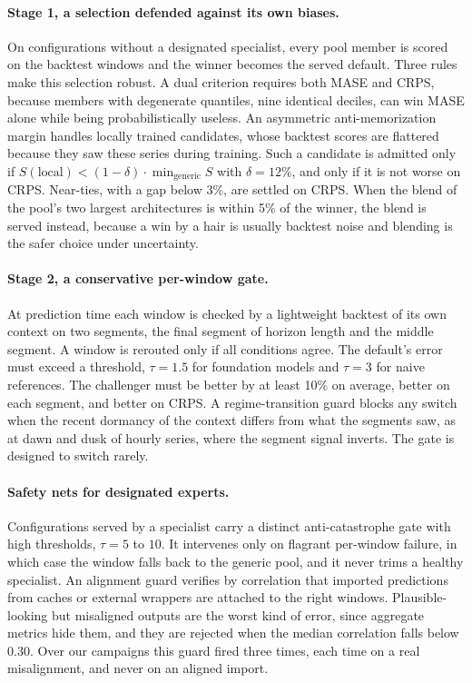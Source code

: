 \documentclass[11pt]{article}
\begin{document}
\paragraph{Stage 1, a selection defended against its own biases.} On
configurations without a designated specialist, every pool member is
scored on the backtest windows and the winner becomes the served default.
Three rules make this selection robust. A dual criterion requires both
MASE and CRPS, because members with degenerate quantiles, nine identical
deciles, can win MASE alone while being probabilistically useless. An
asymmetric anti-memorization margin handles locally trained candidates,
whose backtest scores are flattered because they saw these series during
training. Such a candidate is admitted only if $S(\mathrm{local}) <
(1-\delta)\cdot\min_{\mathrm{generic}} S$ with $\delta=12\%$, and only if
it is not worse on CRPS. Near-ties, with a gap below 3\%, are settled on
CRPS. When the blend of the pool's two largest architectures is within 5\% of
the winner, the blend is served instead, because a win by a hair is usually
backtest noise and blending is the safer choice under uncertainty.

\paragraph{Stage 2, a conservative per-window gate.} At prediction time
each window is checked by a lightweight backtest of its own context on two
segments, the final segment of horizon length and the middle segment. A
window is rerouted only if all conditions agree. The default's error must
exceed a threshold, $\tau=1.5$ for foundation models and $\tau=3$ for
naive references. The challenger must be better by at least 10\% on
average, better on each segment, and better on CRPS. A regime-transition
guard blocks any switch when the recent dormancy of the context differs
from what the segments saw, as at dawn and dusk of hourly series, where
the segment signal inverts. The gate is designed to switch rarely.

\paragraph{Safety nets for designated experts.} Configurations served by
a specialist carry a distinct anti-catastrophe gate with high thresholds,
$\tau=5$ to $10$. It intervenes only on flagrant per-window failure, in
which case the window falls back to the generic pool, and it never trims a
healthy specialist. An alignment guard verifies by correlation that
imported predictions from caches or external wrappers are attached to the
right windows. Plausible-looking but misaligned outputs are the worst kind
of error, since aggregate metrics hide them, and they are rejected when
the median correlation falls below $0.30$. Over our campaigns this guard
fired three times, each time on a real misalignment, and never on an
aligned import.
\end{document}
